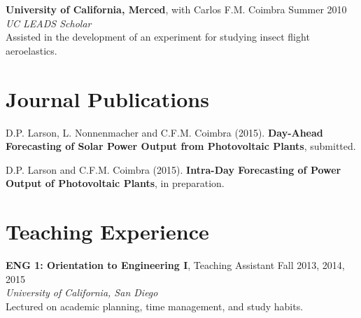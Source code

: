 \documentclass[]{res}
\begin{document}
\begin{resume}
\textbf{University of California, Merced}, with Carlos F.M. Coimbra \hfill Summer 2010 \\
\textit{UC LEADS Scholar} \\
Assisted in the development of an experiment for studying insect flight aeroelastics.


%


\section{Journal Publications}
\vspace{0.1in}

D.P. Larson, L. Nonnenmacher and C.F.M. Coimbra (2015). \textbf{Day-Ahead Forecasting of Solar Power Output from Photovoltaic Plants}, submitted.

D.P. Larson and C.F.M. Coimbra (2015). \textbf{Intra-Day Forecasting of Power Output of Photovoltaic Plants}, in preparation.


\section{Teaching Experience}
\vspace{0.1in}

\textbf{ENG 1: Orientation to Engineering I}, Teaching Assistant \hfill Fall 2013, 2014, 2015 \\
\textit{University of California, San Diego} \\
Lectured on academic planning, time management, and study habits.


\end{resume}
\end{document}
